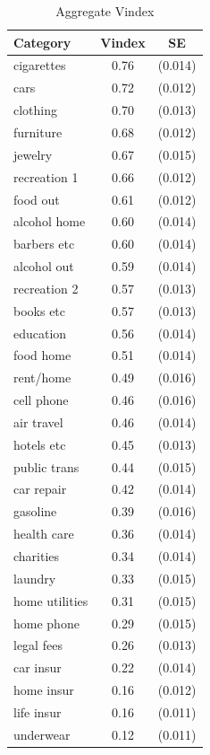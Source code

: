 \documentclass[12pt]{article}
\begin{document}
\begin{table}[!ht]
    \centering
\begin{tabular}{lcc}
	\hline\hline
	Category & Vindex & SE \\
	\hline 
cigarettes       & 0.76 & (0.014) \\
cars             & 0.72 & (0.012) \\
clothing         & 0.70 & (0.013) \\
furniture        & 0.68 & (0.012) \\
jewelry          & 0.67 & (0.015) \\
recreation 1     & 0.66 & (0.012) \\
food out         & 0.61 & (0.012) \\
alcohol home     & 0.60 & (0.014) \\
barbers etc      & 0.60 & (0.014) \\
alcohol out      & 0.59 & (0.014) \\
recreation 2     & 0.57 & (0.013) \\
books etc        & 0.57 & (0.013) \\
education        & 0.56 & (0.014) \\
food home        & 0.51 & (0.014) \\
rent/home        & 0.49 & (0.016) \\
cell phone       & 0.46 & (0.016) \\
air travel       & 0.46 & (0.014) \\
hotels etc       & 0.45 & (0.013) \\
public trans     & 0.44 & (0.015) \\
car repair       & 0.42 & (0.014) \\
gasoline         & 0.39 & (0.016) \\
health care      & 0.36 & (0.014) \\
charities        & 0.34 & (0.014) \\
laundry          & 0.33 & (0.015) \\
home utilities   & 0.31 & (0.015) \\
home phone       & 0.29 & (0.015) \\
legal fees       & 0.26 & (0.013) \\
car insur        & 0.22 & (0.014) \\
home insur       & 0.16 & (0.012) \\
life insur       & 0.16 & (0.011) \\
underwear        & 0.12 & (0.011) \\
\hline
\end{tabular}
\caption{Aggregate Vindex}
\label{tab:vintab}
\vspace{-2in}
\end{table}
\end{document}
